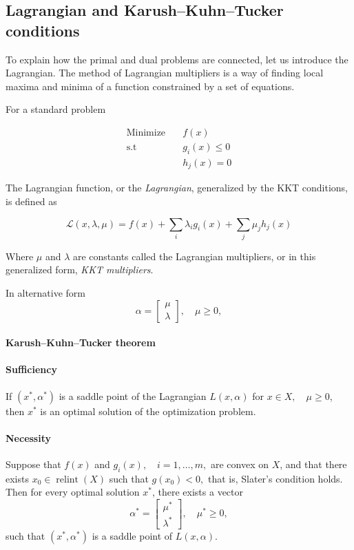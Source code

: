 \documentclass[12pt, openany]{article}
\begin{document}
\subsection{Lagrangian and Karush–Kuhn–Tucker conditions}\label{sec:lagrangian_kkt}

To explain how the primal and dual problems are connected, let us introduce the Lagrangian. The method of Lagrangian multipliers is a way of finding local maxima and minima of a function constrained by a set of equations.

For a standard problem

\[
\begin{aligned}
\text{Minimize} & \quad
f(x) \\[4pt]
\text{s.t} & \quad g_i(x)\le 0 \\[4pt]
&\quad  h_j(x)=0
\end{aligned}
\]

The Lagrangian function, or the \textit{Lagrangian}, generalized by the KKT conditions, is defined as

\begin{equation}
    \mathcal L(x,\lambda,\mu)=f(x)+\sum_i \lambda_i g_i(x)+\sum_j \mu_j h_j(x)
\end{equation}


Where \(\mu\) and \(\lambda\) are constants called the Lagrangian multipliers, or in this generalized form, \textit{KKT multipliers}.

In alternative form
\[ 
\alpha = \begin{bmatrix} \mu\\ \lambda\end{bmatrix}, \quad \mu \ge 0, 
\] 

\paragraph{Karush–Kuhn–Tucker theorem} 
\paragraph{Sufficiency} If \( (x^*, \alpha^*) \) is a saddle point of the Lagrangian \( L(x,\alpha)\) for \( x \in X, \quad \mu \ge 0 \), then \(x^*\) is an optimal solution of the optimization problem. 

\paragraph{Necessity} Suppose that \( f(x) \) and \( g_i(x), \quad i=1,\dots,m, \) are convex on \(X\), and that there exists \( x_0 \in \operatorname{relint}(X) \) such that \( g(x_0) < 0, \) that is, Slater's condition holds. Then for every optimal solution \(x^\ast\), there exists a vector 
\[ 
\alpha^\ast = \begin{bmatrix} \mu^\ast \\ \lambda^\ast \end{bmatrix}, \quad \mu^\ast \ge 0, 
\] 
such that \( (x^\ast,\alpha^\ast) \) is a saddle point of \( L(x,\alpha). \)
\end{document}
